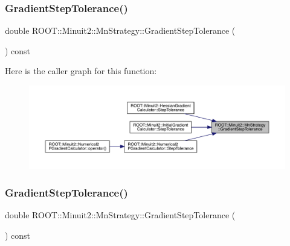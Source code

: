 \subsubsection{\texorpdfstring{GradientStepTolerance()}{GradientStepTolerance()}\hspace{0.1cm}{\footnotesize\ttfamily [1/2]}}
{\footnotesize\ttfamily double R\+O\+O\+T\+::\+Minuit2\+::\+Mn\+Strategy\+::\+Gradient\+Step\+Tolerance (\begin{DoxyParamCaption}{ }\end{DoxyParamCaption}) const\hspace{0.3cm}{\ttfamily [inline]}}

Here is the caller graph for this function\+:\nopagebreak
\begin{figure}[H]
\begin{center}
\leavevmode
\includegraphics[width=350pt]{da/de4/classROOT_1_1Minuit2_1_1MnStrategy_a5352522cca1056c242a309d29e28e3c2_icgraph}
\end{center}
\end{figure}
\mbox{\label{classROOT_1_1Minuit2_1_1MnStrategy_a5352522cca1056c242a309d29e28e3c2}} 
\subsubsection{\texorpdfstring{GradientStepTolerance()}{GradientStepTolerance()}\hspace{0.1cm}{\footnotesize\ttfamily [2/2]}}
{\footnotesize\ttfamily double R\+O\+O\+T\+::\+Minuit2\+::\+Mn\+Strategy\+::\+Gradient\+Step\+Tolerance (\begin{DoxyParamCaption}{ }\end{DoxyParamCaption}) const\hspace{0.3cm}{\ttfamily [inline]}}

\mbox{\label{classROOT_1_1Minuit2_1_1MnStrategy_a94681b616c41570e2c81ef5c94cb81dd}} 
